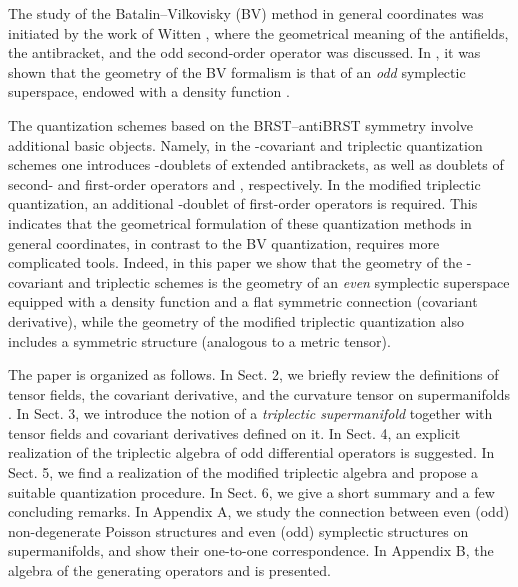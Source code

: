 \documentclass[a4paper,11pt]{article}
\begin{document}
The study of the Batalin--Vilkovisky (BV) method \cite{bv} in general
coordinates was initiated by the work of Witten \cite{w}, where the
geometrical meaning of the antifields, the antibracket, and the odd
second-order operator \myHighlight{$\Delta $}\coordHE{} was discussed. In \cite{geom}, it was shown
that the geometry of the BV formalism is that of an \textit{odd} symplectic
superspace, endowed with a density function \myHighlight{$\rho $}\coordHE{}.

The quantization schemes based on the BRST--antiBRST symmetry involve
additional basic objects. Namely, in the \coordHE{}-covariant and triplectic
quantization schemes one introduces \coordHE{}-doublets of extended
antibrackets, as well as doublets of second- and first-order operators \coordHE{} and \coordHE{}, respectively. In the modified triplectic
quantization, an additional \coordHE{}-doublet of first-order operators \coordHE{}
is required. This indicates that the geometrical formulation of these
quantization methods in general coordinates, in contrast to the BV
quantization, requires more complicated tools. Indeed, in this paper we show
that the geometry of the \coordHE{}-covariant and triplectic schemes is the
geometry of an \textit{even} symplectic superspace equipped with a density
function and a flat symmetric connection (covariant derivative), while the
geometry of the modified triplectic quantization also includes a symmetric
structure (analogous to a metric tensor).

The paper is organized as follows. In Sect. 2, we briefly review
the definitions of tensor fields, the covariant derivative, and
the curvature tensor on supermanifolds \cite{DeWitt}. In Sect. 3,
we introduce the notion of a \emph{triplectic
supermanifold}\myHighlight{$\emph{,}$}\coordHE{} together with tensor fields and covariant
derivatives defined on it. In Sect. 4, an explicit realization of
the triplectic algebra of odd differential operators is suggested.
In Sect. 5, we find a realization of the modified triplectic
algebra and propose a suitable quantization procedure. In Sect. 6,
we give a short summary and a few concluding remarks. In Appendix
A, we study the connection between even (odd) non-degenerate
Poisson structures and even (odd) symplectic structures on
supermanifolds, and show their one-to-one correspondence. In
Appendix B, the algebra of the generating operators \coordHE{}
and \coordHE{} is presented.
\end{document}

